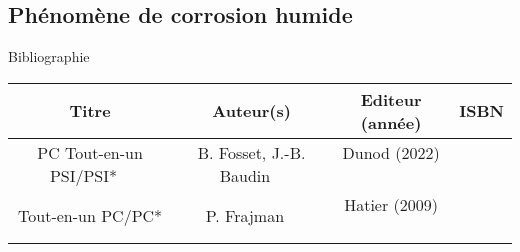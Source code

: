 \begin{headerBlock}
\chapter{Phénomène de corrosion humide}
\label{LC_Corrosion}
 \end{headerBlock}



\begin{reportBlock}{Bibliographie}

\begin{center}
\begin{tabular}{|c|c|c|c|}\hline
Titre & Auteur(s) & Editeur (année) & ISBN \\ \hline
PC Tout-en-un PSI/PSI* ~ & B. Fosset, J.-B. Baudin ~ & Dunod (2022) ~ & ~ \\
Tout-en-un PC/PC* & P. Frajman ~ &  Hatier (2009) ~ & ~ \\
\hline
\end{tabular}
\end{center}

\end{reportBlock}

